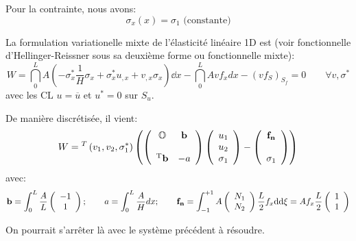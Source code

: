 \medskip
Pour la contrainte, nous avons:
\begin{equation} \sigma_x(x)=\sigma_1 \text{ (constante)} \end{equation}

\medskip
La formulation variationelle mixte de l'élasticité linéaire 1D est (voir fonctionnelle
d'Hellinger-Reissner sous sa deuxième forme ou fonctionnelle mixte):
\begin{equation}
W=\dint_0^L A\left(-\sigma_x^*\frac1H\sigma_x+\sigma_x^*u_{,x}+v_{,x}\sigma_x\right) \dd x
-\dint_0^L Avf_x dx - (v f_S)_{S_f} = 0\qquad \forall v,\sigma^*
\end{equation}
avec les CL $u=\overline{u}$ et $u^*=0$ sur $S_u$.

\medskip
De manière discrétisée, il vient:
\begin{equation}
W = {}^T\left( v_1, v_2, \sigma_1^*\right)\left(
\left( \begin{array}{cc} \mathbb{O} & \mathbf{b}\\ ~\\ {}^\mathrm{T}\mathbf{b} & -a \end{array}\right)
\left( \begin{array}{c} u_1\\u_2\\ \sigma_1 \end{array}\right)
- \left( \begin{array}{c} \mathbf{f_n}\\~\\ \sigma_1 \end{array}\right)
\right)\end{equation}
avec:
\begin{equation}
\mathbf{b}=\displaystyle\int_0^L \frac{A}L \left( \begin{array}{c} -1\\1\end{array}\right); \qquad
a=\displaystyle\int_0^L \frac{A}H dx; \qquad
\mathbf{f_n} = \displaystyle\int_{-1}^{+1} A \left( \begin{array}{c} N_1\\N_2 \end{array}\right) \frac{L}2 f_x \text{d} \text{d} \xi =
 A f_x \frac{L}2  \left( \begin{array}{c} 1\\1 \end{array}\right)
\end{equation}

\medskip
On pourrait s'arrêter là avec le système précédent à résoudre.

